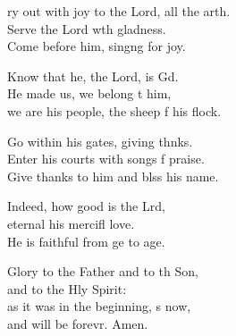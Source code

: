 \settowidth{\versewidth}{Cry out with joy to the Lord, all the earth. +}
\begin{psalmverse}%
  \begin{patverse}
ry out with joy to the Lord, all the arth.\Flex\\
Serve the Lord w\pointup{\i}th gladness.\Med\\
Come before him, sing\pointup{\i}ng for joy.

Know that he, the Lord, is Gd.\Flex\\
He made us, we belong t him,\Med\\
we are his people, the sheep f his flock.

Go within his gates, giving thnks.\Flex\\
Enter his courts with songs f praise.\Med\\
Give thanks to him and blss his name.

Indeed, how good is the Lrd,\Flex\\
eternal his mercifl love.\Med\\
He is faithful from ge to age.

Glory to the Father and to th Son,\Med\\
and to the Hly Spirit:\\
as it was in the beginning, \pointup{\i}s now,\Med\\
and will be forevr. Amen.
  \end{patverse}
\end{psalmverse}
